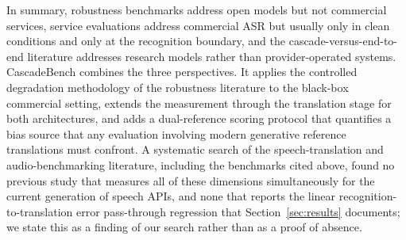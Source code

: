 In summary, robustness benchmarks address open models but not commercial
services, service evaluations address commercial ASR but usually only in
clean conditions and only at the recognition boundary, and the
cascade-versus-end-to-end literature addresses research models rather than
provider-operated systems. CascadeBench combines the three perspectives. It
applies the controlled degradation methodology of the robustness literature
to the black-box commercial setting, extends the measurement through the
translation stage for both architectures, and adds a dual-reference scoring
protocol that quantifies a bias source that any evaluation involving modern
generative reference translations must confront. A systematic search of the speech-translation and
audio-benchmarking literature, including the benchmarks cited above, found
no previous study that measures all of these dimensions simultaneously for
the current generation of speech APIs, and none that reports the linear
recognition-to-translation error pass-through regression that
Section~\ref{sec:results} documents; we state this as a finding of our
search rather than as a proof of absence.

